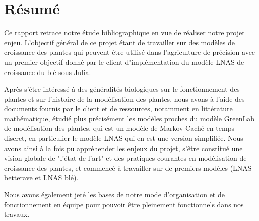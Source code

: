 \section{Résumé}

Ce rapport retrace notre étude bibliographique en vue de réaliser notre projet enjeu. L'objectif général de ce projet étant de travailler sur des modèles de croissance des plantes qui peuvent être utilisé dans l'agriculture de précision avec un premier objectif donné par le client d'implémentation du modèle LNAS de croissance du blé sous Julia. 

Après s'être intéressé  à des généralités biologiques sur le fonctionnement des plantes et sur l'histoire de la modélisation des plantes, nous avons à l'aide des documents fournis par le client et de ressources, notamment en littérature mathématique, étudié plus précisément les modèles proches du modèle GreenLab de modélisation des plantes, qui est un modèle de Markov Caché en temps discret, en particulier le modèle LNAS qui en est une version simplifiée. Nous avons ainsi à la fois pu appréhender les enjeux du projet, s'être constitué une vision globale de "l'état de l'art" et des pratiques courantes en modélisation de croissance des plantes, et commencé à travailler sur de premiers modèles (LNAS betterave et LNAS blé). 

Nous avons également jeté les bases de notre mode d'organisation et de fonctionnement en équipe pour pouvoir être pleinement fonctionnels dans nos travaux.